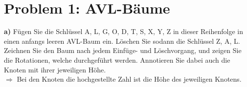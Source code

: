 
\section*{{Problem 1: AVL-Bäume}}


\textbf{a)} Fügen Sie die Schlüssel A, L, G, O, D, T, S, X, Y, Z in dieser Reihenfolge in einen anfangs leeren AVL-Baum ein. Löschen Sie sodann die Schlüssel Z, A, L. Zeichnen Sie den Baum nach jedem Einfüge- und Löschvorgang, und zeigen Sie die Rotationen, welche durchgeführt werden. Annotieren Sie dabei auch die Knoten mit ihrer jeweiligen Höhe.\\

$\Rightarrow$ Bei den Knoten die hochgestellte Zahl ist die Höhe des jeweiligen Knotens.

